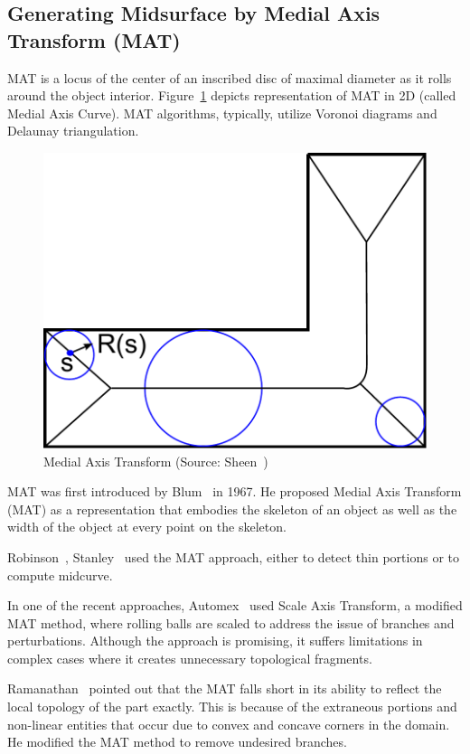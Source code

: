 \subsection{Generating Midsurface by Medial Axis Transform (MAT)}

MAT is a locus of the center of an inscribed disc of maximal diameter as it rolls around the object interior. Figure~\ref{fig:litsurvey:mat} depicts representation of MAT in 2D (called Medial Axis Curve). MAT algorithms, typically, utilize Voronoi diagrams and Delaunay triangulation. 



\begin{figure}[!h]
\centering
\includegraphics[width=0.3\linewidth]{images/MAT1.pdf}
\caption{Medial Axis Transform (Source: Sheen~\cite{Sheen2008})}
\label{fig:litsurvey:mat}
\end{figure}



MAT was first introduced by Blum~\cite{Harry1967} in 1967. He proposed Medial Axis Transform (MAT) as a representation that embodies the skeleton of an object as well as the width of the object at every point on the skeleton.  

Robinson~\cite{Robinson2006, Robinson2007}, Stanley~\cite{Stanley2010} used the MAT approach, either to detect thin portions or to compute midcurve. 

In one of the recent approaches, Automex~\cite{Automex} used Scale Axis Transform, a modified MAT method, where rolling balls are scaled to address the issue of branches and perturbations. Although the approach is promising, it suffers limitations in complex cases where it creates unnecessary topological fragments.

Ramanathan~\cite{Ramanathan2004} pointed out that the MAT falls short in its ability to reflect the local topology of the part exactly. This is because of the extraneous portions and non-linear entities that occur due to convex and concave corners in the domain. 
He modified the MAT method to remove undesired branches. 

